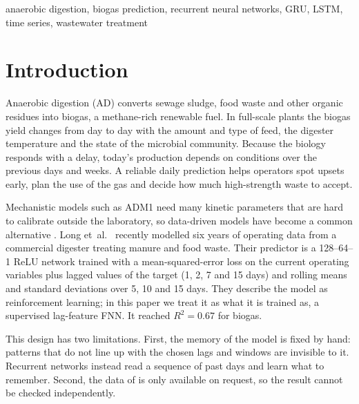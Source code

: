 \documentclass[conference]{IEEEtran}
\begin{document}
\begin{IEEEkeywords}
anaerobic digestion, biogas prediction, recurrent neural networks, GRU, LSTM, time series,
wastewater treatment
\end{IEEEkeywords}

\section{Introduction}

Anaerobic digestion (AD) converts sewage sludge, food waste and other organic residues into
biogas, a methane-rich renewable fuel. In full-scale plants the biogas yield changes from day
to day with the amount and type of feed, the digester temperature and the state of the
microbial community. Because the biology responds with a delay, today's production depends on
conditions over the previous days and weeks. A reliable daily prediction helps operators
spot upsets early, plan the use of the gas and decide how much high-strength waste to accept.

Mechanistic models such as ADM1 need many kinetic parameters that are hard to calibrate
outside the laboratory, so data-driven models have become a common alternative
\cite{cruz2022,ling2024,rutland2023}. Long et~al.~\cite{long2026} recently modelled six years
of operating data from a commercial digester treating manure and food waste. Their predictor
is a 128--64--1 ReLU network trained with a mean-squared-error loss on the current operating
variables plus lagged values of the target (1, 2, 7 and 15 days) and rolling means and standard
deviations over 5, 10 and 15 days. They describe the model as reinforcement learning; in this
paper we treat it as what it is trained as, a supervised lag-feature FNN. It reached $R^2=0.67$
for biogas.

This design has two limitations. First, the memory of the model is fixed by hand: patterns
that do not line up with the chosen lags and windows are invisible to it. Recurrent networks
\cite{elman1990,hochreiter1997,cho2014} instead read a sequence of past days and learn what to
remember. Second, the data of \cite{long2026} is only available on request, so the result
cannot be checked independently.
\end{document}
